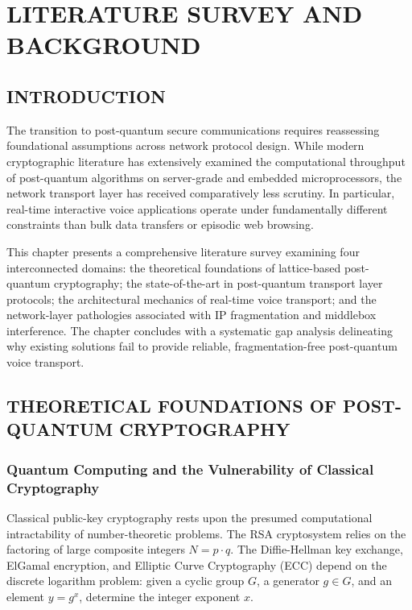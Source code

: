 \chapter{LITERATURE SURVEY AND BACKGROUND}

\section{INTRODUCTION}
The transition to post-quantum secure communications requires reassessing foundational assumptions across network protocol design. While modern cryptographic literature has extensively examined the computational throughput of post-quantum algorithms on server-grade and embedded microprocessors, the network transport layer has received comparatively less scrutiny. In particular, real-time interactive voice applications operate under fundamentally different constraints than bulk data transfers or episodic web browsing. 

This chapter presents a comprehensive literature survey examining four interconnected domains: the theoretical foundations of lattice-based post-quantum cryptography; the state-of-the-art in post-quantum transport layer protocols; the architectural mechanics of real-time voice transport; and the network-layer pathologies associated with IP fragmentation and middlebox interference. The chapter concludes with a systematic gap analysis delineating why existing solutions fail to provide reliable, fragmentation-free post-quantum voice transport.

\section{THEORETICAL FOUNDATIONS OF POST-QUANTUM CRYPTOGRAPHY}

\subsection{Quantum Computing and the Vulnerability of Classical Cryptography}
Classical public-key cryptography rests upon the presumed computational intractability of number-theoretic problems. The RSA cryptosystem relies on the factoring of large composite integers $N = p \cdot q$. The Diffie-Hellman key exchange, ElGamal encryption, and Elliptic Curve Cryptography (ECC) depend on the discrete logarithm problem: given a cyclic group $G$, a generator $g \in G$, and an element $y = g^x$, determine the integer exponent $x$.

